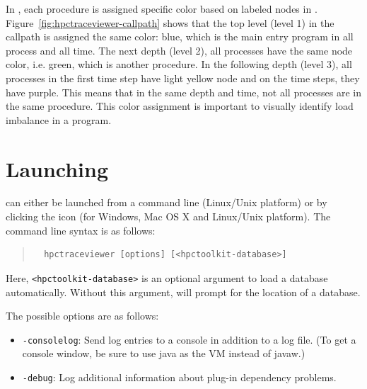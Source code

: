 In \hpctraceviewer, each procedure is assigned specific color based on labeled nodes in \hpcviewer. Figure~\ref{fig:hpctraceviewer-callpath} shows that the top level (level 1) in the callpath is assigned the same color: blue, which is the main entry program in all process and all time.
The next depth (level 2), all processes have the same node color, i.e. green, which is another procedure. 
In the following depth (level 3), all processes in the first time step have light yellow node and on the time steps, they have purple. This means that in the same depth and time, not all processes are in the same procedure.
This color assignment is important to visually identify load imbalance in a program.


\section{Launching}

\hpctraceviewer{} can either be launched from a command line (Linux/Unix platform) or by clicking the \hpctraceviewer{} icon (for Windows, Mac OS X and Linux/Unix platform).
The command line syntax is as follows:
\begin{quote}
\begin{verbatim}
  hpctraceviewer [options] [<hpctoolkit-database>]
\end{verbatim}
\end{quote}
Here, \texttt{<hpctoolkit-database>} is an optional argument to load a database automatically.
Without this argument, \hpctraceviewer{} will prompt for the location of a database.

The possible options are as follows:
\begin{itemize}

 \item \texttt{-consolelog}: Send log entries to a console in addition to a log file.
   (To get a console window, be sure to use java as the VM instead of javaw.)

 \item \texttt{-debug}: Log additional information about plug-in dependency problems.
\end{itemize}



